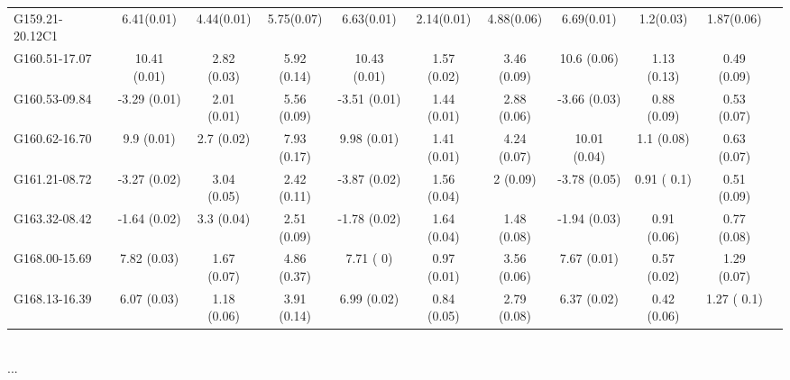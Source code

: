 \documentclass{article}
\begin{document}
\begin{table}[H]
\begin{tabular}{lcccccccccc}
            G159.21-20.12C1     &  6.41(0.01)   &  4.44(0.01)  &  5.75(0.07)  &   6.63(0.01)   &  2.14(0.01)  &  4.88(0.06)  & 6.69(0.01)  &  1.2(0.03) & 1.87(0.06)&      \\
            G160.51-17.07     & 10.41 (0.01) & 2.82 (0.03) &  5.92  (0.14) &10.43   (0.01)  &  1.57   (0.02) &  3.46 (0.09) &   10.6   (0.06)  &  1.13  (0.13) &  0.49 (0.09) &     \\
            G160.53-09.84     & -3.29 (0.01) & 2.01 (0.01) &  5.56  (0.09) &-3.51   (0.01)  &  1.44   (0.01) &  2.88 (0.06) &  -3.66   (0.03)  &  0.88  (0.09) &  0.53 (0.07) &     \\
            G160.62-16.70     &   9.9 (0.01) &  2.7 (0.02) &  7.93  (0.17) & 9.98   (0.01)  &  1.41   (0.01) &  4.24 (0.07) &  10.01   (0.04)  &   1.1  (0.08) &  0.63 (0.07) &     \\
            G161.21-08.72     & -3.27 (0.02) & 3.04 (0.05) &  2.42  (0.11) &-3.87   (0.02)  &  1.56   (0.04) &     2 (0.09) &  -3.78   (0.05)  &  0.91  ( 0.1) &  0.51 (0.09) &     \\
            G163.32-08.42     & -1.64 (0.02) &  3.3 (0.04) &  2.51  (0.09) &-1.78   (0.02)  &  1.64   (0.04) &  1.48 (0.08) &  -1.94   (0.03)  &  0.91  (0.06) &  0.77 (0.08) &     \\
            G168.00-15.69     &  7.82 (0.03) & 1.67 (0.07) &  4.86  (0.37) & 7.71   (   0)  &  0.97   (0.01) &  3.56 (0.06) &   7.67   (0.01)  &  0.57  (0.02) &  1.29 (0.07) &     \\
            G168.13-16.39     &  6.07 (0.03) & 1.18 (0.06) &  3.91  (0.14) & 6.99   (0.02)  &  0.84   (0.05) &  2.79 (0.08) &   6.37   (0.02)  &  0.42  (0.06) &  1.27 ( 0.1) &  \\
                \end{tabular}
                \\
                \LARGE{...}
        \end{table}

\newpage
\end{document}
